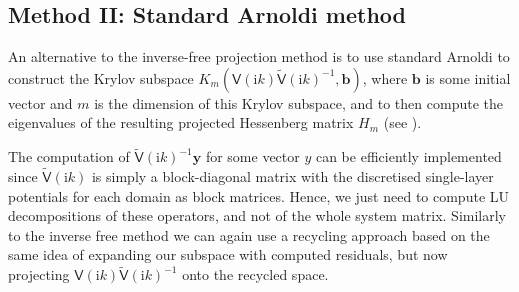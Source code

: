 \subsection{Method II: Standard Arnoldi method}

An alternative to the inverse-free projection method is to use standard Arnoldi to construct the Krylov subspace  
$K_{m}(\mathsf{V}(\mathrm{i}k)\tilde{\mathsf{V}}(\mathrm{i}k)^{-1}, \boldsymbol{b})$, where $\boldsymbol{b}$ is some 
initial vector and $m$ is the dimension of this Krylov subspace, and to then compute the eigenvalues of the resulting projected Hessenberg matrix $H_m$ (see \cite{saad2011numerical}).

The computation of $\tilde{\mathsf{V}}(\mathrm{i}k)^{-1}\boldsymbol{y}$ for some vector $y$ can be efficiently implemented since $\tilde{\mathsf{V}}(\mathrm{i}k)$ is simply a block-diagonal matrix with the
discretised single-layer potentials for each domain as block matrices. Hence, we just need to compute LU decompositions of these operators, and not of the whole system matrix.
Similarly to the inverse free method we can again use a recycling approach based on the same idea of expanding our subspace with computed residuals, but now projecting
$\mathsf{V}(\mathrm{i}k)\tilde{\mathsf{V}}(\mathrm{i}k)^{-1}$ onto the recycled space.


%


